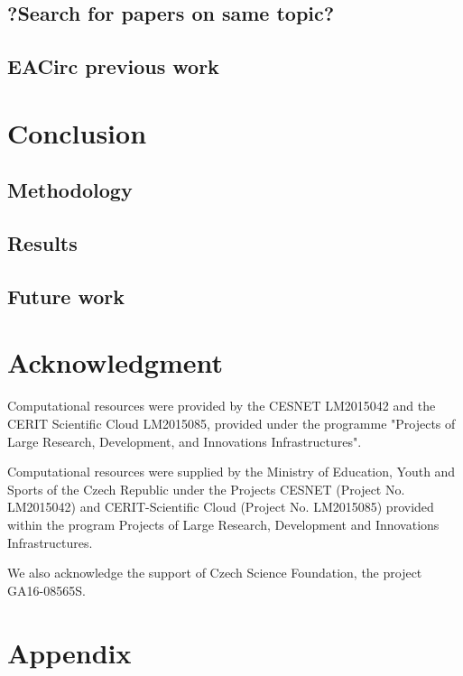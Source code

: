 \documentclass[
  print, %
  Table,   %
  nolof,     %
  nolot,     %
  11pt, %
  oneside  %
]{fithesis3}
\begin{document}
\section{?Search for papers on same topic?}
\label{sec:relatwork-paper}

\section{EACirc previous work}
\label{sec:relatwork-eac}

\chapter{Conclusion}
\label{chap:conclusion}

\section{Methodology}
\label{sec:conclusion-method}
\section{Results}
\label{sec:conclusion-results}
\section{Future work}
\label{sec:conclusion-future}

\chapter*{Acknowledgment}
\label{chap:ack}

Computational resources were provided by the CESNET LM2015042 and the CERIT Scientific Cloud LM2015085, provided under the programme "Projects of Large Research, Development, and Innovations Infrastructures".

Computational resources were supplied by the Ministry of Education, Youth and Sports of the Czech Republic under the Projects CESNET (Project No. LM2015042) and CERIT-Scientific Cloud (Project No. LM2015085) provided within the program Projects of Large Research, Development and Innovations Infrastructures.

We also acknowledge the support of Czech Science Foundation, the project GA16-08565S.


\chapter*{Appendix}
\label{chap:app}
\end{document}
